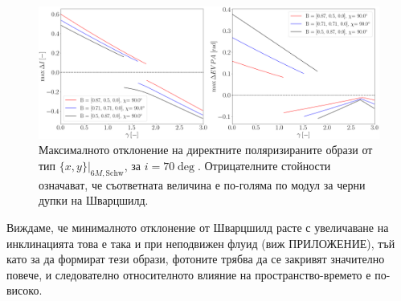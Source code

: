 \begin{figure}[!htb]
	\hspace{-0.5cm}
	\includegraphics[scale = 0.22]{WH_70_deg_param_sweep.png}
	\caption[Максималното отклонение на директните поляризираните образи от тип $\{x,y\}\vert_{6M, \text{Schw}}$, за $i = 70\deg$]{Максималното отклонение на директните поляризираните образи от тип $\{x,y\}\vert_{6M, \text{Schw}}$, за $i = 70\deg$. Отрицателните стойности означават, че съответната величина е по-голяма по модул за черни дупки на Шварцшилд.} 
	\label{WH_max_deviation_70_deg}
\end{figure}

Виждаме, че минималното отклонение от Шварцшилд расте с увеличаване на инклинацията това е така и при неподвижен флуид (виж ПРИЛОЖЕНИЕ), тъй като за да формират тези образи, фотоните трябва да се закривят значително повече, и следователно относителното влияние на пространство-времето е по-високо.

